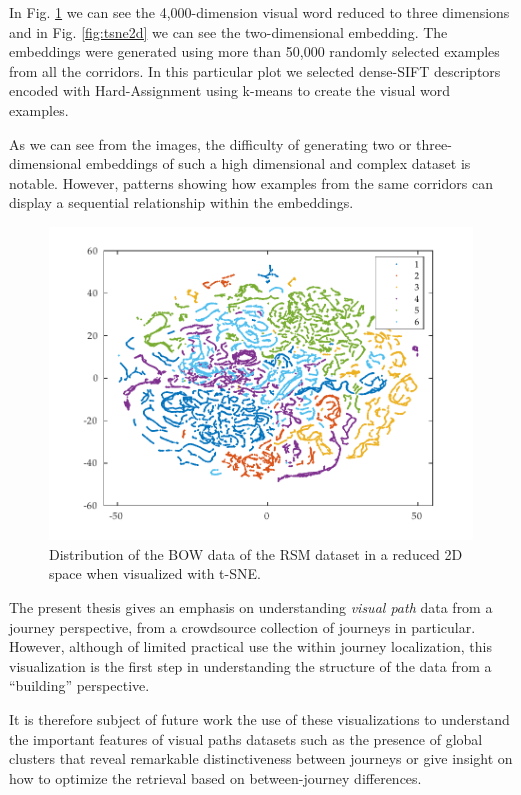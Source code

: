 In Fig. \ref{fig:tsne3d} we can see the 4,000-dimension visual word reduced to three dimensions and in Fig. \ref{fig:tsne2d} we can see the two-dimensional embedding. The embeddings were generated using more than 50,000 randomly selected examples from all the corridors. In this particular plot we selected dense-SIFT descriptors encoded with Hard-Assignment using k-means to create the visual word examples.

As we can see from the images, the difficulty of generating two or three-dimensional embeddings of such a high dimensional and complex dataset is notable. However, patterns showing how examples from the same corridors can display a sequential relationship within the embeddings.


\begin{figure}
\centering
\includegraphics[width=\textwidth]{gfx/Chapter04/tsne_dsift_2d.pdf}
\caption{Distribution of the BOW data of the RSM dataset in a reduced 2D space when visualized with t-SNE.}
\label{fig:tsne3d}
\end{figure}

The present thesis gives an emphasis on understanding \textit{visual path} data from a journey perspective, from a crowdsource collection of journeys in particular. However, although of limited practical use the within journey localization, this visualization is the first step in understanding the structure of the data from a ``building'' perspective.

It is therefore subject of future work the use of these visualizations to understand the important features of visual paths datasets such as the presence of global clusters that reveal remarkable distinctiveness between journeys or give insight on how to optimize the retrieval based on between-journey differences.

